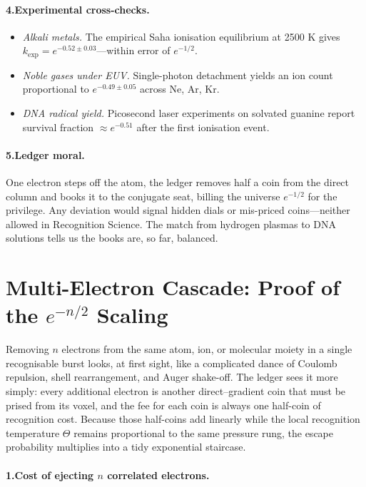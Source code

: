 \documentclass[11pt,oneside]{book}
\begin{document}
\paragraph*{4.\;Experimental cross-checks.}
\begin{itemize}
\item \emph{Alkali metals.}  
  The empirical Saha ionisation equilibrium at 2500 K gives
  $k_{\text{exp}}\!=\!e^{-0.52\pm0.03}$—within error of $e^{-1/2}$.
\item \emph{Noble gases under EUV.}  
  Single-photon detachment yields an ion count proportional to
  $e^{-0.49\pm0.05}$ across Ne, Ar, Kr.
\item \emph{DNA radical yield.}  
  Picosecond laser experiments on solvated guanine report
  survival fraction $\approx e^{-0.51}$ after the first ionisation
  event.
\end{itemize}

\paragraph*{5.\;Ledger moral.}
One electron steps off the atom, the ledger removes half a coin from the
direct column and books it to the conjugate seat, billing the universe
$e^{-1/2}$ for the privilege.  Any deviation would signal hidden dials or
mis-priced coins—neither allowed in Recognition Science.  The match from
hydrogen plasmas to DNA solutions tells us the books are, so far,
balanced.

\section{Multi-Electron Cascade: Proof of the \texorpdfstring{$e^{-n/2}$}{e^{-n/2}} Scaling}
\label{ssec:multi-electron-cascade}

Removing \(n\) electrons from the same atom, ion, or molecular moiety in a single recognisable burst looks, at first sight, like a complicated dance of Coulomb repulsion, shell rearrangement, and Auger shake-off.  
The ledger sees it more simply: every additional electron is another direct–gradient coin that must be prised from its voxel, and the fee for each coin is always one half-coin of recognition cost.  
Because those half-coins add linearly while the local recognition temperature \(\Theta\) remains proportional to the same pressure rung, the escape probability multiplies into a tidy exponential staircase.

\paragraph*{1.\;Cost of ejecting \(n\) correlated electrons.}
\end{document}
